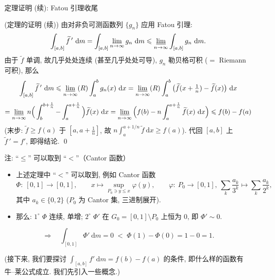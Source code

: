 \begin{frame}{定理证明 (续): Fatou 引理收尾}

\startproof[bg=yellow, fg=red](定理的证明 (续))
由对非负可测函数列 $\{ g_n \}$ 应用 Fatou 引理:
\[
\int_{[a, b]} \widetilde{f}\,' ~ \mathrm{d} m
= \int_{[a, b]} \lim_{n \to \infty} g_n ~ \mathrm{d} m
\leqslant \varliminf_{n \to \infty} \int_{[a, b]} g_n ~ \mathrm{d} m .
\]
由于 $\widetilde{f}$ 单调, 故几乎处处连续 (甚至几乎处处可导), $g_n$ 勒贝格可积
($=$ Riemann 可积), 那么
\[
\int_{[a, b]} \widetilde{f}\,' ~ \mathrm{d} m
\leqslant \varliminf_{n \to \infty} (R) \int_a^b g_n(x) ~ \mathrm{d} x
= \varliminf_{n \to \infty} (R) \int_a^b
\big( \widetilde{f}(x + \tfrac1n) - \widetilde{f}(x) \big) ~ \mathrm{d} x
\]
\[
= \varliminf_{n \to \infty} n \Big( \int_b^{b + \frac1n} - \int_a^{a + \frac1n} \Big)
\widetilde{f}(x) ~ \mathrm{d} x
= \varliminf_{n \to \infty} \Big( f(b) - n \int_a^{a + \frac1n} \widetilde{f}(x) ~ \mathrm{d} x \Big)
\leqslant f(b) - f(a)
\]
(末步: $\widetilde{f} \geqslant f(a)$ 于 $[a, a + \frac1n]$, 故
$n \int_a^{a+1/n} \widetilde{f} ~ \mathrm{d} x \geqslant f(a)$).
代回 $[a, b]$ 上 $\widetilde{f}\,' = f'$, 即得结论.
\qed

\end{frame}


\begin{frame}{注: ``$\leqslant$'' 可以取到 ``$<$''（Cantor 函数）}

\begin{itemize}
\item 上述定理中 ``$<$'' 可以取到, 例如 \alert{Cantor 函数}
\[
\Phi:\ [0, 1] \to [0, 1],
\qquad
x \longmapsto \sup_{P_0 \ni y \leqslant x} \varphi(y),
\qquad
\varphi:\ P_0 \to [0, 1],\ \sum_k \frac{a_k}{3^k} \mapsto \sum_k \frac{a_k}{2^k} ,
\]
其中 $a_k \in \{ 0, 2 \}$ ($P_0$ 为 Cantor 集, 三进制展开).
\item 那么: $1^{\circ}$ $\Phi$ 连续, 单增; \qquad
$2^{\circ}$ $\Phi'$ 在 $G_0 = [0, 1] \setminus P_0$ 上恒为 $0$, 即 $\Phi' \sim 0$.
\end{itemize}

\pause

\[
\Longrightarrow\quad
\int_{[0, 1]} \Phi' ~ \mathrm{d} m = 0
\;<\;
\Phi(1) - \Phi(0) = 1 - 0 = 1 .
\]

\pause

(接下来, 我们要探讨 $\int_{[a, b]} f' ~ \mathrm{d} m = f(b) - f(a)$ 的条件,
即什么样的函数有牛--莱公式成立. 我们先引入一些概念.)

\end{frame}

